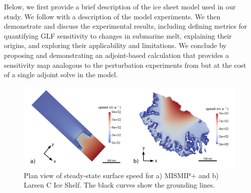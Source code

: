 \documentclass[tc, manuscript]{copernicus}
\begin{document}

Below, we first provide a brief description of the ice sheet model used in our study. We follow with a description of the model experiments. We then demonstrate and discuss the experimental results, including defining metrics for quantifying GLF sensitivity to changes in submarine melt, explaining their origins, and exploring their applicability and limitations.  We conclude by proposing and demonstrating an adjoint-based calculation that provides a sensitivity map analogous to the perturbation experiments from \citet{reese2018} but at the cost of a single adjoint solve in the model. 


\begin{figure}
\centering
\includegraphics[width=1\linewidth]{./figs/mismip_larsenc.pdf}
\caption{Plan view of steady-state surface speed for a) MISMIP+ and b) Larsen C Ice Shelf. The black curves show the grounding lines.}
\label{mismip_larsenc}
\end{figure}
\end{document}
